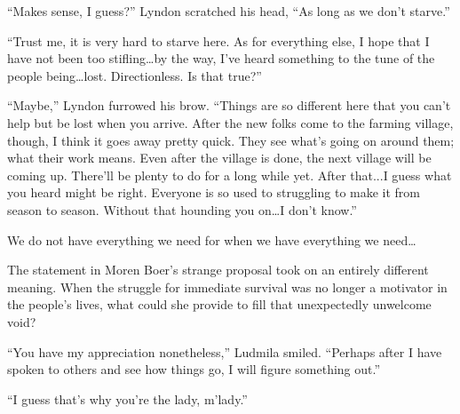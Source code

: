 “Makes sense, I guess?” Lyndon scratched his head, “As long as we don’t starve.”

 

“Trust me, it is very hard to starve here. As for everything else, I hope that I have not been too stifling…by the way, I’ve heard something to the tune of the people being…lost. Directionless. Is that true?”

 

“Maybe,” Lyndon furrowed his brow. “Things are so different here that you can’t help but be lost when you arrive. After the new folks come to the farming village, though, I think it goes away pretty quick. They see what’s going on around them; what their work means. Even after the village is done, the next village will be coming up. There’ll be plenty to do for a long while yet. After that...I guess what you heard might be right. Everyone is so used to struggling to make it from season to season. Without that hounding you on…I don’t know.”

 

We do not have everything we need for when we have everything we need…

 

The statement in Moren Boer’s strange proposal took on an entirely different meaning. When the struggle for immediate survival was no longer a motivator in the people’s lives, what could she provide to fill that unexpectedly unwelcome void?

 

“You have my appreciation nonetheless,” Ludmila smiled. “Perhaps after I have spoken to others and see how things go, I will figure something out.”

 

“I guess that’s why you’re the lady, m’lady.”